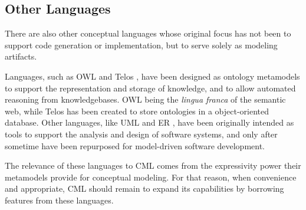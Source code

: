 \subsection{Other Languages}

There are also other conceptual languages whose original focus has not been to support code generation or implementation,
but to serve solely as modeling artifacts.

Languages, such as OWL \cite{owl2} and Telos \cite{telos}, have been designed as ontology metamodels
to support the representation and storage of knowledge,
and to allow automated reasoning from knowledgebases.
OWL being the \emph{lingua franca} of the semantic web,
while Telos has been created to store ontologies in a object-oriented database.
Other languages, like UML \cite{uml} and ER \cite{er}, have been originally intended as tools to support the analysis and design of software systems, and only after sometime have been repurposed for model-driven software development.

The relevance of these languages to CML comes from the expressivity power their metamodels provide for conceptual modeling. For that reason, when convenience and appropriate, CML should remain to expand its capabilities by borrowing features from these languages.
